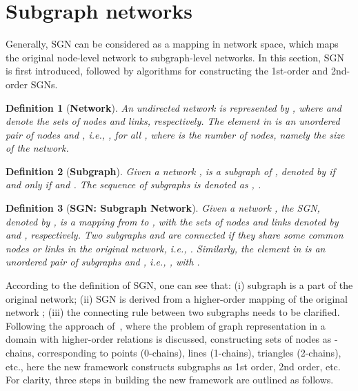 \documentclass[10pt,journal,compsoc]{IEEEtran}
\begin{document}
\section{Subgraph networks}\label{sec:SGN}
Generally, SGN can be considered as a mapping in network space, which maps the original node-level network to subgraph-level networks.
In this section, SGN is first introduced, followed by algorithms for constructing the 1st-order and 2nd-order SGNs.

\newtheorem{myDef}{Definition}
\begin{myDef}[\textbf{Network}]\label{def:1}
An undirected network is represented by , where  and  denote the sets of nodes and links, respectively. The element  in  is an unordered pair of nodes  and , i.e., , for all , where  is the number of nodes, namely the size of the network.
\end{myDef}

\begin{myDef}[\textbf{Subgraph}]\label{def:2}
Given a network ,  is a subgraph of , denoted by  if and only if  and . The sequence of subgraphs is denoted as , .
\end{myDef}

\begin{myDef}[\textbf{SGN: Subgraph Network}]\label{def:3}
Given a network , the SGN, denoted by , is a mapping from  to , with the sets of nodes and links denoted by  and , respectively. Two subgraphs  and  are connected if they share some common nodes or links in the original network, i.e., . Similarly, the element  in  is an unordered pair of subgraphs  and , i.e., ,  with .
\end{myDef}

According to the definition of SGN, one can see that: (i) subgraph is a part of the original network; (ii) SGN is derived from a higher-order mapping of the original network ; (iii) the connecting rule between two subgraphs needs to be clarified. Following the approach of~\cite{agarwal2006higher}, where the problem of graph representation in a domain with higher-order relations is discussed, constructing sets of nodes as -chains, corresponding to points (0-chains), lines (1-chains), triangles (2-chains), etc., here the new framework constructs subgraphs as 1st order, 2nd order, etc. For clarity, three steps in building the new framework are outlined as follows.
\end{document}
